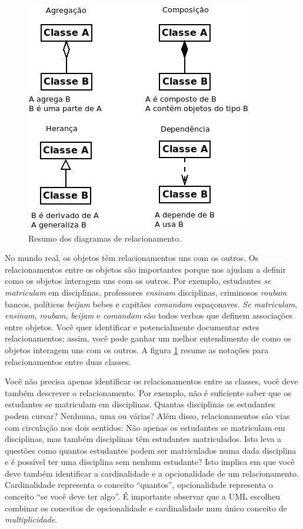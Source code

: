\begin{figure}[ht]
\begin{center}
\includegraphics[scale=0.65]{clsRelac.png}
\end{center}
\caption{Resumo dos diagramas de relacionamento.} \label{fig:relac}
\end{figure}

No mundo real, os objetos têm relacionamentos uns com os outros. Os relacionamentos entre os objetos são importantes porque nos ajudam a definir como os objetos interagem uns com os outros. Por exemplo, estudantes \textit{se matriculam} em disciplinas, professores \textit{ensinam} disciplinas, criminosos \textit{roubam} bancos, políticos \textit{beijam} bebes e capitães \textit{comandam} espaçonaves. \textit{Se matriculam}, \textit{ensinam}, \textit{roubam}, \textit{beijam} e \textit{comandam} são todos verbos que definem associações entre objetos. Você quer identificar e potencialmente documentar estes relacionamentos; assim, você pode ganhar um melhor entendimento de como os objetos interagem uns com os outros. A figura \ref{fig:relac} resume as notações para relacionamentos entre duas classes.

Você não precisa apenas identificar os relacionamentos entre as classes, você deve também descrever o relacionamento. Por exemplo, não é suficiente saber que os estudantes se matriculam em disciplinas. Quantas disciplinas os estudantes podem cursar? Nenhuma, uma ou várias? Além disso, relacionamentos são vias com circulação nos dois sentidos: Não apenas os estudantes se matriculam em disciplinas, mas também disciplinas têm estudantes matriculados. Isto leva a questões como quantos estudantes podem ser matriculados numa dada disciplina e é possível ter uma disciplina sem nenhum estudante? Isto implica em que você deve também identificar a cardinalidade e a opcionalidade de um relacionamento. Cardinalidade representa o conceito ``quantos'', opcionalidade representa o conceito ``se você deve ter algo''. É importante observar que a UML escolheu combinar os conceitos de opcionalidade e cardinalidade num único conceito de \emph{multiplicidade}.


